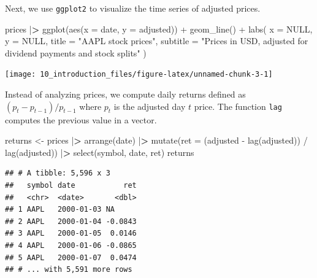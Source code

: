 \documentclass[
]{book}
\newenvironment{Shaded}{\begin{snugshade}}{\end{snugshade}}
\newcommand{\AttributeTok}[1]{\textcolor[rgb]{0.61,0.61,0.61}{#1}}
\newcommand{\ConstantTok}[1]{\textcolor[rgb]{0,0,0}{#1}}
\newcommand{\ErrorTok}[1]{\textcolor[rgb]{0.14,0.14,0.14}{\textbf{#1}}}
\newcommand{\FunctionTok}[1]{\textcolor[rgb]{0,0,0}{#1}}
\newcommand{\NormalTok}[1]{#1}
\newcommand{\OtherTok}[1]{\textcolor[rgb]{0.37,0.37,0.37}{#1}}
\newcommand{\SpecialCharTok}[1]{\textcolor[rgb]{0,0,0}{#1}}
\newcommand{\StringTok}[1]{\textcolor[rgb]{0.5,0.5,0.5}{#1}}
\begin{document}
Next, we use \texttt{ggplot2} to visualize the time series of adjusted prices.

\begin{Shaded}
\begin{Highlighting}[]
\NormalTok{prices }\SpecialCharTok{|}\ErrorTok{\textgreater{}}
  \FunctionTok{ggplot}\NormalTok{(}\FunctionTok{aes}\NormalTok{(}\AttributeTok{x =}\NormalTok{ date, }\AttributeTok{y =}\NormalTok{ adjusted)) }\SpecialCharTok{+}
  \FunctionTok{geom\_line}\NormalTok{() }\SpecialCharTok{+}
  \FunctionTok{labs}\NormalTok{(}
    \AttributeTok{x =} \ConstantTok{NULL}\NormalTok{,}
    \AttributeTok{y =} \ConstantTok{NULL}\NormalTok{,}
    \AttributeTok{title =} \StringTok{"AAPL stock prices"}\NormalTok{,}
    \AttributeTok{subtitle =} \StringTok{"Prices in USD, adjusted for dividend payments and stock splits"}
\NormalTok{  )}
\end{Highlighting}
\end{Shaded}

\begin{center}\texttt{[image: 10\_introduction\_files/figure-latex/unnamed-chunk-3-1]} \end{center}

Instead of analyzing prices, we compute daily returns defined as \((p_t - p_{t-1}) / p_{t-1}\) where \(p_t\) is the adjusted day \(t\) price. The function \texttt{lag} computes the previous value in a vector.

\begin{Shaded}
\begin{Highlighting}[]
\NormalTok{returns }\OtherTok{\textless{}{-}}\NormalTok{ prices }\SpecialCharTok{|}\ErrorTok{\textgreater{}}
  \FunctionTok{arrange}\NormalTok{(date) }\SpecialCharTok{|}\ErrorTok{\textgreater{}}
  \FunctionTok{mutate}\NormalTok{(}\AttributeTok{ret =}\NormalTok{ (adjusted }\SpecialCharTok{{-}} \FunctionTok{lag}\NormalTok{(adjusted)) }\SpecialCharTok{/} \FunctionTok{lag}\NormalTok{(adjusted)) }\SpecialCharTok{|}\ErrorTok{\textgreater{}}
  \FunctionTok{select}\NormalTok{(symbol, date, ret)}
\NormalTok{returns}
\end{Highlighting}
\end{Shaded}

\begin{verbatim}
## # A tibble: 5,596 x 3
##   symbol date           ret
##   <chr>  <date>       <dbl>
## 1 AAPL   2000-01-03 NA     
## 2 AAPL   2000-01-04 -0.0843
## 3 AAPL   2000-01-05  0.0146
## 4 AAPL   2000-01-06 -0.0865
## 5 AAPL   2000-01-07  0.0474
## # ... with 5,591 more rows
\end{verbatim}
\end{document}
